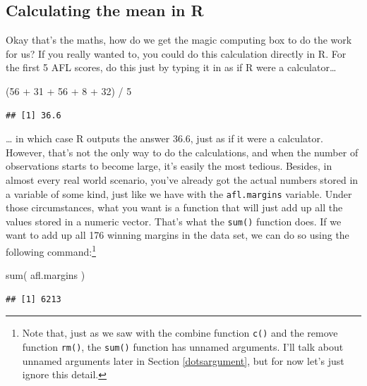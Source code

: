 \documentclass[
]{book}
\newenvironment{Shaded}{\begin{snugshade}}{\end{snugshade}}
\newcommand{\DecValTok}[1]{\textcolor[rgb]{0.00,0.00,0.81}{#1}}
\newcommand{\FunctionTok}[1]{\textcolor[rgb]{0.00,0.00,0.00}{#1}}
\newcommand{\NormalTok}[1]{#1}
\newcommand{\SpecialCharTok}[1]{\textcolor[rgb]{0.00,0.00,0.00}{#1}}
\begin{document}
\hypertarget{calculating-the-mean-in-r}{%
\subsection{Calculating the mean in R}\label{calculating-the-mean-in-r}}

Okay that's the maths, how do we get the magic computing box to do the work for us? If you really wanted to, you could do this calculation directly in R. For the first 5 AFL scores, do this just by typing it in as if R were a calculator\ldots{}

\begin{Shaded}
\begin{Highlighting}[]
\NormalTok{(}\DecValTok{56} \SpecialCharTok{+} \DecValTok{31} \SpecialCharTok{+} \DecValTok{56} \SpecialCharTok{+} \DecValTok{8} \SpecialCharTok{+} \DecValTok{32}\NormalTok{) }\SpecialCharTok{/} \DecValTok{5}
\end{Highlighting}
\end{Shaded}

\begin{verbatim}
## [1] 36.6
\end{verbatim}

\ldots{} in which case R outputs the answer 36.6, just as if it were a calculator. However, that's not the only way to do the calculations, and when the number of observations starts to become large, it's easily the most tedious. Besides, in almost every real world scenario, you've already got the actual numbers stored in a variable of some kind, just like we have with the \texttt{afl.margins} variable. Under those circumstances, what you want is a function that will just add up all the values stored in a numeric vector. That's what the \texttt{sum()} function does. If we want to add up all 176 winning margins in the data set, we can do so using the following command:\footnote{Note that, just as we saw with the combine function \texttt{c()} and the remove function \texttt{rm()}, the \texttt{sum()} function has unnamed arguments. I'll talk about unnamed arguments later in Section \ref{dotsargument}, but for now let's just ignore this detail.}

\begin{Shaded}
\begin{Highlighting}[]
\FunctionTok{sum}\NormalTok{( afl.margins )}
\end{Highlighting}
\end{Shaded}

\begin{verbatim}
## [1] 6213
\end{verbatim}
\end{document}

